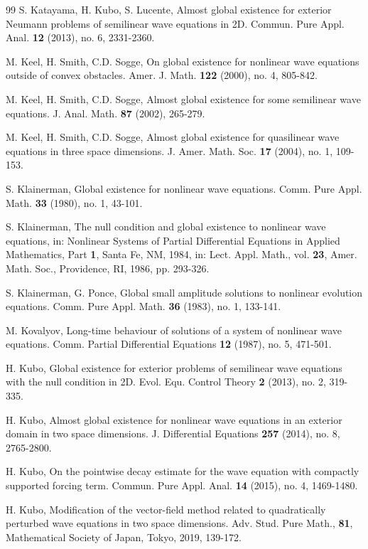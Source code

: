 \documentclass[11pt,twoside]{article}
\theoremstyle{plain}
\theoremstyle{definition}
\numberwithin{equation}{section}
\begin{document}
\begin{thebibliography}{99}
S. Katayama, H. Kubo, S. Lucente, Almost global existence for exterior Neumann problems of semilinear wave equations in 2D.
Commun. Pure Appl. Anal. \textbf{12} (2013), no. 6, 2331-2360.

M. Keel, H. Smith, C.D. Sogge,  On global existence for nonlinear wave equations outside of convex obstacles.
Amer. J. Math. \textbf{122} (2000), no. 4, 805-842.


M. Keel, H. Smith, C.D. Sogge, Almost global existence for some semilinear wave equations.
J. Anal. Math. \textbf{87} (2002), 265-279.

M. Keel, H. Smith, C.D. Sogge, Almost global existence for quasilinear wave equations in three space dimensions.
J. Amer. Math. Soc. \textbf{17} (2004), no. 1, 109-153.

S. Klainerman, Global existence for nonlinear wave equations.
Comm. Pure Appl. Math. \textbf{33} (1980), no. 1, 43-101.


S. Klainerman, The null condition and global existence to nonlinear wave equations, in: Nonlinear Systems
of Partial Differential Equations in Applied Mathematics, Part \textbf{1}, Santa Fe, NM, 1984, in:
Lect. Appl. Math., vol. \textbf{23}, Amer. Math. Soc., Providence, RI, 1986, pp. 293-326.

S. Klainerman, G. Ponce,  Global small amplitude solutions to nonlinear evolution equations.
Comm. Pure Appl. Math. \textbf{36}  (1983), no. 1, 133-141.

M. Kovalyov, Long-time behaviour of solutions of a system of nonlinear wave equations.
Comm. Partial Differential Equations \textbf{12} (1987), no. 5, 471-501.


H. Kubo, Global existence for exterior problems of semilinear wave equations with the null condition in 2D.
Evol. Equ. Control Theory \textbf{2} (2013), no. 2, 319-335.

H. Kubo, Almost global existence for nonlinear wave equations in an exterior domain in two space dimensions.
J. Differential Equations \textbf{257} (2014), no. 8, 2765-2800.

H. Kubo, On the pointwise decay estimate for the wave equation with compactly supported forcing term.
Commun. Pure Appl. Anal. \textbf{14} (2015), no. 4, 1469-1480.

H. Kubo, Modification of the vector-field method related to quadratically perturbed wave equations in two space dimensions.
Adv. Stud. Pure Math., \textbf{81},
Mathematical Society of Japan, Tokyo, 2019, 139-172.


\end{thebibliography}
\end{document}
